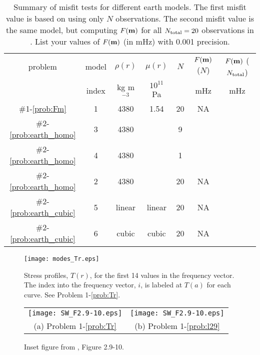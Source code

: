 \documentclass[11pt,titlepage,fleqn]{article}
\begin{document}
\begin{table}
\centering
\caption[]
{{
Summary of misfit tests for different earth models.
The first misfit value is based on using only $N$ observations.
The second misfit value is the same model, but computing $F(\mbox{${\bf m}$})$ for all $N_{\rm total}=20$ observations in .
List your values of $F(\mbox{${\bf m}$})$ (in mHz) with 0.001 precision.
\label{tab:homo}
}}
\begin{spacing}{1.5}
\begin{tabular}{||c|c|c|c|c|c||c|}
\hline
problem & model & $\rho(r)$ & $\mu(r)$ & $N$ & $F(\mbox{${\bf m}$})$ ($N$) & $F(\mbox{${\bf m}$})$ ($N_{\rm total}$) \\
& index & kg m$^{-3}$ & $10^{11}$ Pa & & mHz & mHz \\ \hline\hline
$\#$1-\ref{prob:Fm} & 1 & 4380 & 1.54 & 20 & NA &  \\  \hline
$\#$2-\ref{prob:earth_homo} & 3 & 4380 &      & 9  &  &  \\  \hline
$\#$2-\ref{prob:earth_homo} & 4 & 4380 &      & 1  &  &  \\  \hline
\hline
$\#$2-\ref{prob:earth_homo} & 2 & 4380 &      & 20 & NA  &  \\  \hline
$\#$2-\ref{prob:earth_cubic} & 5 & linear & linear & 20 & NA  & \\ \hline
$\#$2-\ref{prob:earth_cubic} & 6 & cubic & cubic & 20 & NA  & \\ \hline
\hline
\end{tabular}
\end{spacing}
\end{table}

\clearpage\pagebreak

\begin{figure}
\centering
\texttt{[image: modes\_Tr.eps]}
\caption[]
{{
Stress profiles, $T(r)$, for the first 14 values in the frequency vector.
The index into the frequency vector, $i$, is labeled at $T(a)$ for each curve.
See Problem 1-\ref{prob:Tr}.
\label{fig:Tr}
}}
\end{figure}

\begin{figure}
\hspace{-1cm}
\begin{tabular}{cc}
\texttt{[image: SW\_F2.9-10.eps]} &
\texttt{[image: SW\_F2.9-10.eps]} \\
(a) Problem 1-\ref{prob:Tr} & (b) Problem 1-\ref{prob:l29} 
\end{tabular}
\caption[]
{{
Inset figure from \citet{SteinWysession}, Figure 2.9-10.
\label{fig:dots}
}}
\end{figure}

\end{document}
